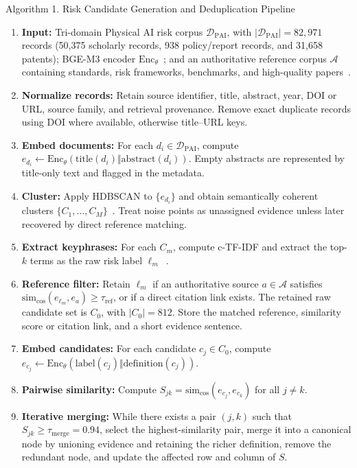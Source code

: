 \documentclass[11pt]{article}
\newcommand{\DPAI}{\mathcal{D}_{\mathrm{PAI}}}
\newcommand{\Enc}{\mathrm{Enc}_{\theta}}
\newcommand{\simcos}{\mathrm{sim}_{\cos}}
\begin{document}
\begin{algobox}{Algorithm 1. Risk Candidate Generation and Deduplication Pipeline}
\begin{enumerate}[leftmargin=1.6em,itemsep=0.35em]
  \item \textbf{Input:} Tri-domain Physical AI risk corpus \(\DPAI\), with \(|\DPAI|=82,971\) records (50,375 scholarly records, 938 policy/report records, and 31,658 patents); BGE-M3 encoder \(\Enc\)~\cite{chen2024bgem3}; and an authoritative reference corpus \(\mathcal{A}\) containing standards, risk frameworks, benchmarks, and high-quality papers~\cite{nist-airmf,iso23894,iso10218,mitre-atlas,sermanet-asimov}.
  \item \textbf{Normalize records:} Retain source identifier, title, abstract, year, DOI or URL, source family, and retrieval provenance. Remove exact duplicate records using DOI where available, otherwise title--URL keys.
  \item \textbf{Embed documents:} For each \(d_i \in \DPAI\), compute \(e_{d_i} \leftarrow \Enc(\mathrm{title}(d_i) \Vert \mathrm{abstract}(d_i))\). Empty abstracts are represented by title-only text and flagged in the metadata.
  \item \textbf{Cluster:} Apply HDBSCAN to \(\{e_{d_i}\}\) and obtain semantically coherent clusters \(\{C_1,\ldots,C_M\}\)~\cite{campello2013,hdbscan2017}. Treat noise points as unassigned evidence unless later recovered by direct reference matching.
  \item \textbf{Extract keyphrases:} For each \(C_m\), compute c-TF-IDF and extract the top-\(k\) terms as the raw risk label \(\ell_m\)~\cite{grootendorst2022}.
  \item \textbf{Reference filter:} Retain \(\ell_m\) if an authoritative source \(a \in \mathcal{A}\) satisfies \(\simcos(e_{\ell_m},e_a)\geq\tau_{\mathrm{ref}}\), or if a direct citation link exists. The retained raw candidate set is \(C_0\), with \(|C_0|=812\). Store the matched reference, similarity score or citation link, and a short evidence sentence.
  \item \textbf{Embed candidates:} For each candidate \(c_j \in C_0\), compute \(e_{c_j}\leftarrow\Enc(\mathrm{label}(c_j)\Vert\mathrm{definition}(c_j))\).
  \item \textbf{Pairwise similarity:} Compute \(S_{jk}=\simcos(e_{c_j},e_{c_k})\) for all \(j\neq k\).
  \item \textbf{Iterative merging:} While there exists a pair \((j,k)\) such that \(S_{jk}\geq\tau_{\mathrm{merge}}=0.94\), select the highest-similarity pair, merge it into a canonical node by unioning evidence and retaining the richer definition, remove the redundant node, and update the affected row and column of \(S\).

\end{enumerate}
\end{algobox}
\end{document}

